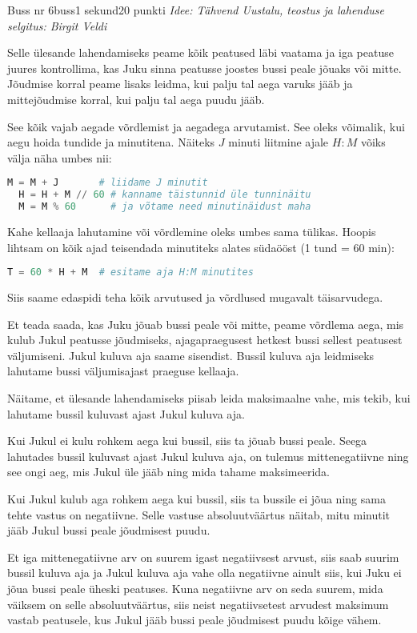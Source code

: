 \begin{yl}{1}{Buss nr 6}{buss}{1 sekund}{20 punkti}
  \emph{Idee: Tähvend Uustalu, teostus ja lahenduse selgitus: Birgit Veldi}

  Selle ülesande lahendamiseks peame kõik peatused läbi vaatama ja iga peatuse juures kontrollima, kas Juku sinna peatusse joostes bussi peale jõuaks või mitte. Jõudmise korral peame lisaks leidma, kui palju tal aega varuks jääb ja mittejõudmise korral, kui palju tal aega puudu jääb.

  See kõik vajab aegade võrdlemist ja aegadega arvutamist. See oleks võimalik, kui aegu hoida tundide ja minutitena. Näiteks $J$ minuti liitmine ajale $H:M$ võiks välja näha umbes nii:
  \begin{lstlisting}[language=Python]
  M = M + J       # liidame J minutit
  H = H + M // 60 # kanname täistunnid üle tunninäitu
  M = M % 60      # ja võtame need minutinäidust maha
  \end{lstlisting}
  Kahe kellaaja lahutamine või võrdlemine oleks umbes sama tülikas.
  Hoopis lihtsam on kõik ajad teisendada minutiteks alates südaööst (1 tund = 60 min):
  \begin{lstlisting}[language=Python]
  T = 60 * H + M  # esitame aja H:M minutites
  \end{lstlisting}
  Siis saame edaspidi teha kõik arvutused ja võrdlused mugavalt täisarvudega. 

  Et teada saada, kas Juku jõuab bussi peale või mitte, peame võrdlema aega, mis kulub Jukul peatusse jõudmiseks, ajagapraegusest hetkest bussi sellest peatusest väljumiseni. Jukul kuluva aja saame sisendist. Bussil kuluva aja leidmiseks lahutame bussi väljumisajast praeguse kellaaja.

  Näitame, et ülesande lahendamiseks piisab leida maksimaalne vahe, mis tekib, kui lahutame bussil kuluvast ajast Jukul kuluva aja.

  Kui Jukul ei kulu rohkem aega kui bussil, siis ta jõuab bussi peale. Seega lahutades bussil kuluvast ajast Jukul kuluva aja, on tulemus mittenegatiivne ning see ongi aeg, mis Jukul üle jääb ning mida tahame maksimeerida.

  Kui Jukul kulub aga rohkem aega kui bussil, siis ta bussile ei jõua ning sama tehte vastus on negatiivne. Selle vastuse absoluutväärtus näitab, mitu minutit jääb Jukul bussi peale jõudmisest puudu.
 
  Et iga mittenegatiivne arv on suurem igast negatiivsest arvust, siis saab suurim bussil kuluva aja ja Jukul kuluva aja vahe olla negatiivne ainult siis, kui Juku ei jõua bussi peale üheski peatuses. Kuna negatiivne arv on seda suurem, mida väiksem on selle absoluutväärtus, siis neist negatiivsetest arvudest maksimum vastab peatusele, kus Jukul jääb bussi peale jõudmisest puudu kõige vähem.


\end{yl}
